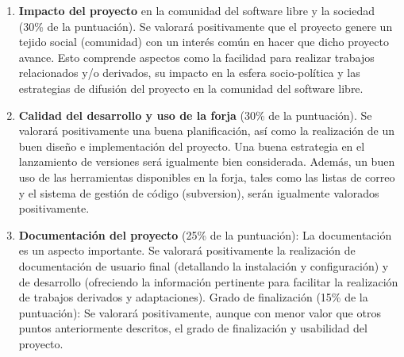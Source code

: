 \begin{enumerate}
    \begin{enumerate}
    \item {\bf Impacto del proyecto} en la comunidad del software libre y la
    sociedad (30\% de la puntuación). Se valorará positivamente que el proyecto
    genere un tejido social (comunidad) con un interés común en hacer que dicho
    proyecto avance. Esto comprende aspectos como la facilidad para realizar
    trabajos relacionados y/o derivados, su impacto en la esfera socio-política
    y las estrategias de difusión del proyecto en la comunidad del software
    libre.
    \item {\bf Calidad del desarrollo y uso de la forja} (30\% de la
    puntuación). Se valorará positivamente una buena planificación, así como la
    realización de un buen diseño e implementación del proyecto. Una buena
    estrategia en el lanzamiento de versiones será igualmente bien considerada.
    Además, un buen uso de las herramientas disponibles en la forja, tales como
    las listas de correo y el sistema de gestión de código (subversion), serán
    igualmente valorados positivamente.
    \item {\bf Documentación del proyecto} (25\% de la puntuación): La
    documentación es un aspecto importante. Se valorará positivamente la
    realización de documentación de usuario final (detallando la instalación y
    configuración) y de desarrollo (ofreciendo la información pertinente para
    facilitar la realización de trabajos derivados y adaptaciones).
    Grado de finalización (15\% de la puntuación): Se valorará positivamente,
    aunque con menor valor que otros puntos anteriormente descritos, el grado de
    finalización y usabilidad del proyecto.
    \end{enumerate}
\end{enumerate}
